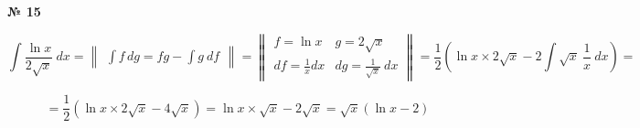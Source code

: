 \documentclass{article}
\begin{document}
\textbf{№ 15} 

$$ \int \frac{\ln{x}}{2\sqrt{x}} \ dx 
= \begin{Vmatrix} \int f \,dg = fg - \int g \ df \end{Vmatrix} =
  \begin{Vmatrix} f = \ln{x} &  g = 2\sqrt{x} \\
                 df = \frac{1}{x}dx  & dg = \frac{1}{\sqrt{x}} \ dx \end{Vmatrix} 
= \frac{1}{2} \left( \ln{x} \times 2\sqrt{x} - 2\int \sqrt{x} \ \frac{1}{x} \ dx \right)
= $$

$$ =  \frac{1}{2} \left( \ln{x} \times 2\sqrt{x} - 4\sqrt{x} \right)
= \ln{x} \times \sqrt{x} - 2\sqrt{x}
= \sqrt{x} \left( \ln{x} - 2 \right)$$
\end{document}
